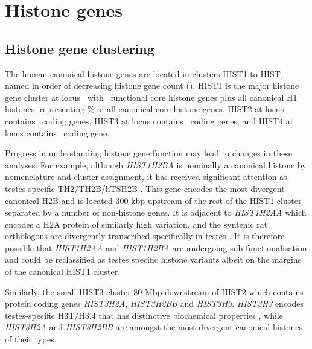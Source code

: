 \section{Histone genes}

  \subsection{Histone gene clustering}
    The human canonical histone genes are located in clusters HIST1 to HIST\NumberOfClusters{},
    named in order of decreasing histone gene count ().
    HIST1 is the major histone gene cluster at locus~\HISTOneLocus{}
    with \CodingGenesInHISTOne{}~functional core histone genes plus all canonical H1 histones,
    representing  \result{}\%
    of all canonical core histone genes.
    HIST2 at locus \HISTTwoLocus{} contains \CodingGenesInHISTTwo{}~coding genes,
    HIST3 at locus \HISTThreeLocus{} contains \CodingGenesInHISTThree{}~coding genes,
    and HIST4 at locus \HISTFourLocus{} contains \CodingGenesInHISTFour{}~coding gene.

    Progress in understanding histone gene function may lead to changes in these analyses.
    For example, although \textit{HIST1H2BA} is nominally a canonical histone
    by nomenclature and cluster assignment,
    it has received significant attention as testes-specific TH2/TH2B/hTSH2B
    \citep{Zalensky2002,LiAusio2005,Shinagawa2014}.
    This gene encodes the most divergent canonical H2B
    and is located 300 kbp upstream of the rest of the HIST1 cluster
    separated by a number of non-histone genes.
    It is adjacent to \textit{HIST1H2AA} which encodes a H2A protein
    of similarly high variation,
    and the syntenic rat orthologous are divergently transcribed
    specifically in testes \citep{HuhChae1991}.
    It is therefore possible that \textit{HIST1H2AA} and \textit{HIST1H2BA}
    are undergoing sub-functionalisation and could be reclassified
    as testes specific histone variants albeit on the margins of the canonical HIST1 cluster.

    \label{sec:hist3h3}
    Similarly, the small HIST3 cluster 80 Mbp downstream of HIST2
    which contains protein coding genes \textit{HIST3H2A}, \textit{HIST3H2BB} and \textit{HIST3H3}.
    \textit{HIST3H3} encodes testes-specific H3T/H3.4
    that has distinctive biochemical properties \citep{WittExpCellRes1996,KurumizakaCOSB2013},
    while \textit{HIST3H2A} and \textit{HIST3H2BB} are amongst
    the most divergent canonical histones of their types.

